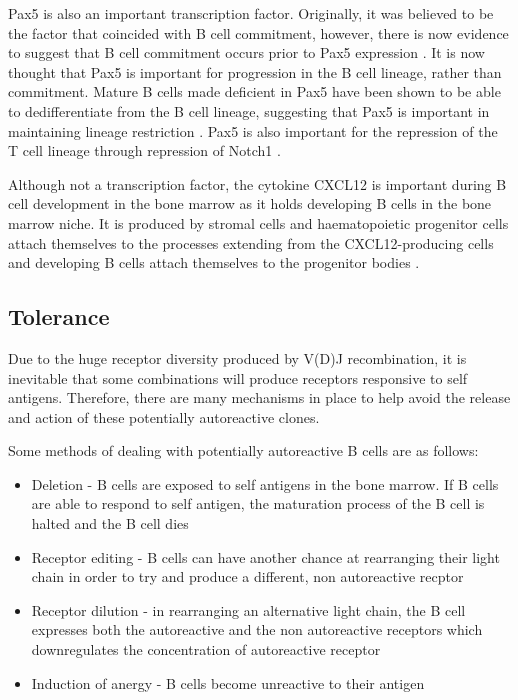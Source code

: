 Pax5 is also an important transcription factor.
Originally, it was believed to be the factor that coincided with B cell commitment, however, there is now evidence to suggest that B cell commitment occurs prior to Pax5 expression \citep{Mansson2008}.
It is now thought that Pax5 is important for progression in the B cell lineage, rather than commitment.
Mature B cells made deficient in Pax5 have been shown to be able to dedifferentiate from the B cell lineage, suggesting that Pax5 is important in maintaining lineage restriction \citep{Cobaleda2007}.
Pax5 is also important for the repression of the T cell lineage through repression of Notch1 \citep{Souabni2002}.

Although not a transcription factor, the cytokine CXCL12 is important during B cell development in the bone marrow as it holds developing B cells in the bone marrow niche.
It is produced by stromal cells and haematopoietic progenitor cells attach themselves to the processes extending from the CXCL12-producing cells and developing B cells attach themselves to the progenitor bodies \citep{Tokoyoda2004}.

\subsection{Tolerance}

Due to the huge receptor diversity produced by V(D)J recombination, it is inevitable that some combinations will produce receptors responsive to self antigens.
Therefore, there are many mechanisms in place to help avoid the release and action of these potentially autoreactive clones.

Some methods of dealing with potentially autoreactive B cells are as follows:
\begin{itemize}
\item Deletion - B cells are exposed to self antigens in the bone marrow. If B cells are able to respond to self antigen, the maturation process of the B cell is halted and the B cell dies \citep{Cornall1995}
\item Receptor editing - B cells can have another chance at rearranging their light chain in order to try and produce a different, non autoreactive recptor \citep{Orduno2009, Gay1993}
\item Receptor dilution - in rearranging an alternative light chain, the B cell expresses both the autoreactive and the non autoreactive receptors which downregulates the concentration of autoreactive receptor \citep{Gay1993, Orduno2009}
\item Induction of anergy - B cells become unreactive to their antigen \citep{Orduno2009}
\end{itemize}

